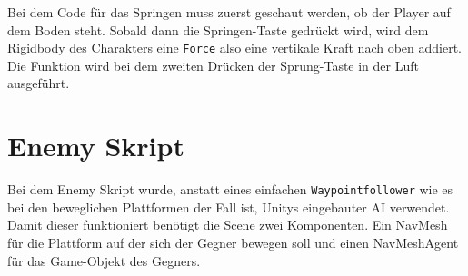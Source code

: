 Bei dem Code für das Springen muss zuerst geschaut werden, ob der Player auf dem Boden steht. Sobald dann die Springen-Taste gedrückt wird, wird dem Rigidbody des Charakters eine \verb+Force+ also eine vertikale Kraft nach oben addiert. Die Funktion wird bei dem zweiten Drücken der Sprung-Taste in der Luft ausgeführt.

\pagebreak
\section{Enemy Skript}

Bei dem Enemy Skript wurde, anstatt eines einfachen \verb+Waypointfollower+ wie es bei den beweglichen Plattformen der Fall ist, Unitys eingebauter AI verwendet. Damit dieser funktioniert benötigt die Scene zwei Komponenten. Ein NavMesh für die Plattform auf der sich der Gegner bewegen soll und einen NavMeshAgent für das Game-Objekt des Gegners.

